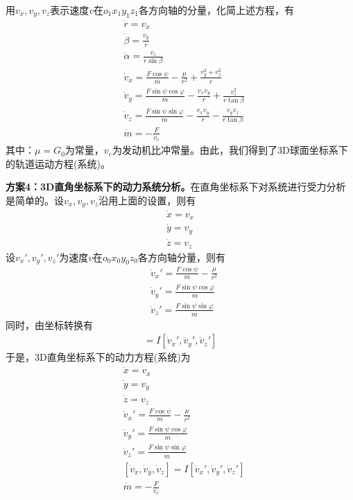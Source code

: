             \par
            用$v_x,v_y,v_z$表示速度$v$在$o_1x_1y_1z_1$各方向轴的分量，化简上述方程，有
            \begin{align*}
            & \dot{r} = v_x\\
            & \dot{\beta} = \frac{v_y}{r}\\
            & \dot{\alpha} = \frac{v_z}{r\sin \beta}\\
            & \dot{v}_x = \frac{F\cos\psi}{m} - \frac{\mu}{r^2} + \frac{v_y^2+v_z^2}{r}\\
            & \dot{v}_y = \frac{F\sin\psi\cos\varphi}{m} - \frac{v_xv_y}{r}+\frac{v_z^2}{r\tan\beta}\\
            & \dot{v}_z = \frac{F\sin \psi\sin\varphi}{m} - \frac{v_xv_y}{r}-\frac{v_yv_z}{r\tan\beta}\\
            & \dot{m} = -\frac{F}{v_e}
            \end{align*}
            其中：$\mu = G_0$为常量，$v_e$为发动机比冲常量。由此，我们得到了3D球面坐标系下的轨道运动方程(系统)。
            \par
            \textbf{方案4：3D直角坐标系下的动力系统分析。}在直角坐标系下对系统进行受力分析是简单的。设$v_x,v_y,v_z$沿用上面的设置，则有
            \begin{align*}
            \dot{x} = v_x\\
            \dot{y} = v_y\\
            \dot{z} = v_z
            \end{align*}
            设$v_x',v_y',v_z'$为速度$v$在$o_0x_0y_0z_0$各方向轴分量，则有
            \begin{align*}
            & \dot{v}_x' = \frac{F\cos\psi}{m} - \frac{\mu}{r^2}\\
            & \dot{v}_y' = \frac{F\sin\psi\cos\varphi}{m}\\
            & \dot{v}_z' = \frac{F\sin\psi\sin\varphi}{m}
            \end{align*}
            同时，由坐标转换有
            \begin{align*}
            [\dot{v}_x,\dot{v}_y,\dot{v}_z] = I[\dot{v}_x',\dot{v}_y',\dot{v}_z']
            \end{align*}
            于是，3D直角坐标系下的动力方程(系统)为
            \begin{align*}
            & \dot{x} = v_x\\
            & \dot{y} = v_y\\
            & \dot{z} = v_z\\
            & \dot{v}_x' = \frac{F\cos\psi}{m} - \frac{\mu}{r^2}\\
            & \dot{v}_y' = \frac{F\sin\psi\cos\varphi}{m}\\
            & \dot{v}_z' = \frac{F\sin\psi\sin\varphi}{m}\\
            & [\dot{v}_x,\dot{v}_y,\dot{v}_z] = I[\dot{v}_x',\dot{v}_y',\dot{v}_z']\\
            & \dot{m} = -\frac{F}{v_e}
            \end{align*}
